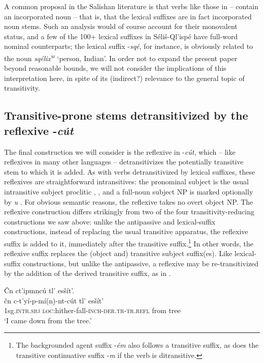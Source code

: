 \documentclass[output=paper,colorlinks,citecolor=brown]{langscibook}
\begin{document}
A common proposal in the Salishan literature is that verbs like those
in -- contain an incorporated noun -- that is, that the lexical
suffixes are in fact incorporated noun stems.  Such an analysis would
of course account for their monovalent status, and a few of the 100+
lexical suffixes in S\'eli\v{s}-Ql'isp\'e have full-word nominal
counterparts; the lexical suffix -\emph{sq\'e}, for instance, is
obviously related to the noun \emph{sq\'elix\textsuperscript w}
`person, Indian'.  In order not to expand the present paper beyond
reasonable bounds, we will not consider the implications of this
interpretation here, in spite of its (indirect?) relevance to the
general topic of transitivity.

\subsection{Transitive-prone stems detransitivized by the reflexive
 -\emph{c\'ut}}   %
\label{thomason_section_2.9}

The final construction we will consider is the reflexive in
-\emph{c\'ut}, which -- like reflexives in many other
languages -- detransitivizes the potentially transitive stem to which
it is added.  As with verbs detransitivized by lexical suffixes, these
reflexives are straightforward intransitives: the pronominal subject
is the usual intransitive subject proclitic , , and a full-noun
subject NP is marked optionally by \emph{{\textltilde}u} .  For
obvious semantic reasons, the reflexive takes no overt object NP.  The
reflexive construction differs strikingly from two of the four
transitivity-reducing constructions we saw above: unlike the
antipassive and lexical-suffix constructions, instead of replacing the
usual transitive apparatus, the reflexive suffix is added to it,
immediately after the transitive suffix.\footnote{The backgrounded
agent suffix -\emph{\'em} also follows a transitive suffix, as does
the transitive continuative suffix -\emph{m} if the verb is
ditransitive.}  In other words, the reflexive suffix replaces the
(object and) transitive subject suffix(es).  Like lexical-suffix
constructions, but unlike the antipassive, a reflexive may be
re-transitivized by the addition of the derived transitive suffix, as
in .

\ea 
\label{ex-thomason-41}
\v{C}n ct'ipmnc\'u tl' es\v{s}\'it'.  \\
\gll \v{c}n c-t'y\'i-p-m\'i(n)-nt-c\'ut tl' es\v{s}\'it' \\
1sg.\textsc{intr.sbj} \textsc{loc}:hither-fall-\textsc{inch-der.tr-tr.refl} from tree \\
\glt `I came down from the tree.'
\z
\end{document}
